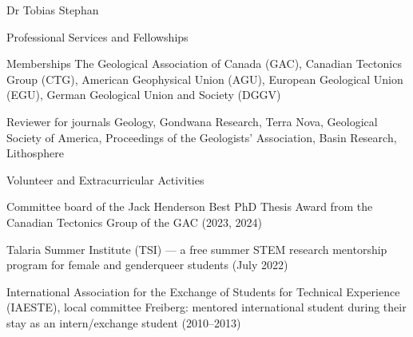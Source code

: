 \documentclass[10pt, paper=letter]{scrartcl} %
\begin{document}
\begin{cv}{Dr Tobias Stephan}
\begin{cvlist}{Professional Services and Fellowships}
    \item[Memberships] The Geological Association of Canada (GAC), Canadian Tectonics Group (CTG), American Geophysical Union (AGU), European Geological Union (EGU), German Geological Union and Society (DGGV)
    \item[Reviewer for journals] Geology, Gondwana Research, Terra Nova, Geological Society of America, Proceedings of the Geologists' Association, Basin Research, Lithosphere
\end{cvlist} 

\begin{cvlist}{Volunteer and Extracurricular Activities}
 \item Committee board of the Jack Henderson Best PhD Thesis Award from the Canadian Tectonics Group of the GAC (2023, 2024)
 \item Talaria Summer Institute (TSI) --- a free summer STEM research mentorship program for female and genderqueer students (July 2022)
 \item International Association for the Exchange of Students for Technical Experience (IAESTE), local committee Freiberg: mentored international student during their stay as an intern/exchange student (2010--2013)
\end{cvlist}



\end{cv}
\end{document}
